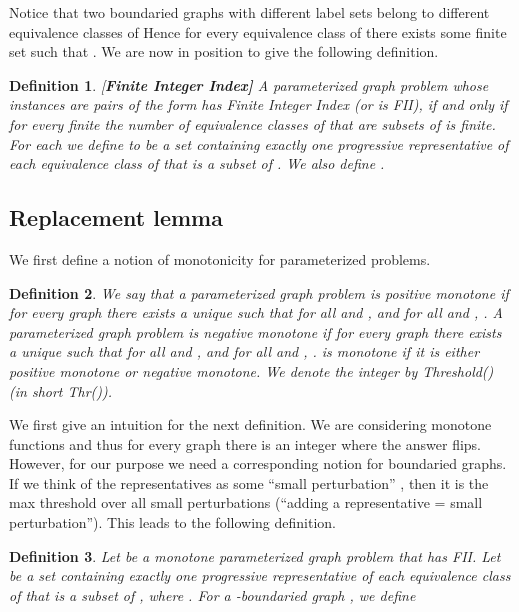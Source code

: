\documentclass[11pt]{article}
\newtheorem{definition}{Definition}
\newcommand{\term}[1]{#1}
\begin{document}
Notice that two  boundaried graphs with different label sets belong to 
different equivalence classes of  Hence for every equivalence 
class  of  there exists some finite set  such that 
. We are now in position  to give the following definition.

\begin{definition}{\rm [\bf Finite Integer Index]}
\label{def:deffii}
A parameterized graph problem  whose instances are pairs of the form 
has {\em Finite Integer Index} (or  is \term{{\em FII}}), if and only if for every finite 
the number of equivalence classes of   that are subsets of 
is finite. For each  we define  to be
a set containing exactly one progressive representative of each equivalence class of 
that is a subset of . We also define . 
\end{definition} 


\subsection{Replacement lemma}




We first define a notion of monotonicity for parameterized problems. 

\begin{definition}
We say that a parameterized graph problem  is {\em positive monotone} if for every graph  
there exists a unique  such that for all  and ,  and for all 
 and , .  A parameterized graph problem  is {\em negative monotone} if for every graph  
there exists a unique  such that for all  and ,  and for all 
 and , .  is monotone if it is either positive monotone or negative monotone.  
We denote the integer  by {\sc Threshold()} (in short  {\sc Thr()}). 
\end{definition}

We first give an intuition for the next definition.  We are considering monotone functions and thus for every graph  
there is an integer  where the answer flips. However, for our purpose we need a corresponding notion for 
boundaried graphs.   If we think of the representatives as some ``small perturbation'' , then it is the max threshold over all small perturbations (``adding a representative = small perturbation''). This leads to the following definition. 

\begin{definition}
Let  be a monotone parameterized graph problem that has FII. Let    be
a set containing exactly one progressive representative of each equivalence class of  that is a subset of 
, where .  
For a -boundaried graph , we define   

\end{definition}
\end{document}
